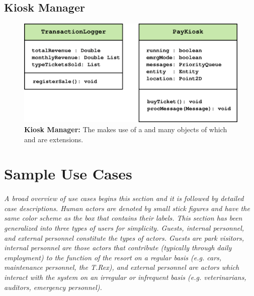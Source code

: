 \documentclass[12pt]{article}
\begin{document}
\subsection{Kiosk Manager}
\begin{figure}[H]
    \centerline{\includegraphics[scale=0.8]{KManager.png}}
    \caption{\textbf{Kiosk Manager:} The \texttt{} makes use of a \texttt{} and many \texttt{} objects
    of which \texttt{} and \texttt{} are extensions.}
    \label{fig:kmanager}
\end{figure}


\section{Sample Use Cases} \label{samp}
\paragraph{} \textit{A broad overview of use cases begins this section and it is followed 
by detailed case descriptions. Human actors are denoted by small stick figures and have the 
same color scheme as the box that contains their labels. This section has been generalized into
three types of users for simplicity. Guests, internal personnel, and external personnel constitute
the types of actors. Guests are park visitors, internal personnel are those actors that contribute 
(typically through daily employment) to the function of the resort on a regular basis (e.g. cars, 
maintenance personnel, the T.Rex), and external personnel are actors which interact with the system
on an irregular or infrequent basis (e.g. veterinarians, auditors, emergency personnel).}

\pagebreak
\end{document}
